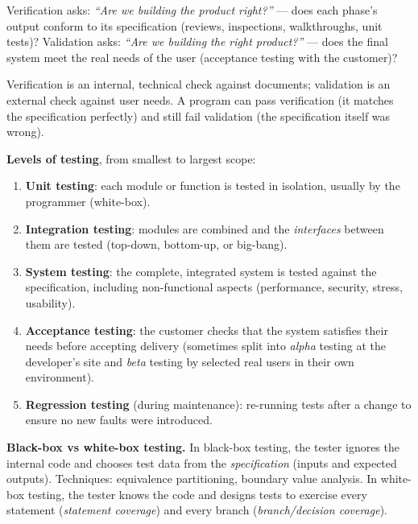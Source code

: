\documentclass[11pt]{article}
\newcommand{\cle}[1]{{\popxbold\color{popdark}#1}}
\begin{document}
\begin{definition}
\cle{Verification} asks: \emph{``Are we building the product right?''} — does each phase's output conform to its specification (reviews, inspections, walkthroughs, unit tests)? \cle{Validation} asks: \emph{``Are we building the right product?''} — does the final system meet the real needs of the user (acceptance testing with the customer)?
\end{definition}

\begin{attention}
Verification is an internal, technical check against documents; validation is an external check against user needs. A program can pass verification (it matches the specification perfectly) and still fail validation (the specification itself was wrong).
\end{attention}

\textbf{Levels of testing}, from smallest to largest scope:

\begin{enumerate}
\item \textbf{Unit testing}: each module or function is tested in isolation, usually by the programmer (white-box).
\item \textbf{Integration testing}: modules are combined and the \emph{interfaces} between them are tested (top-down, bottom-up, or big-bang).
\item \textbf{System testing}: the complete, integrated system is tested against the specification, including non-functional aspects (performance, security, stress, usability).
\item \textbf{Acceptance testing}: the customer checks that the system satisfies their needs before accepting delivery (sometimes split into \emph{alpha} testing at the developer's site and \emph{beta} testing by selected real users in their own environment).
\item \textbf{Regression testing} (during maintenance): re-running tests after a change to ensure no new faults were introduced.
\end{enumerate}

\textbf{Black-box vs white-box testing.} In \cle{black-box} testing, the tester ignores the internal code and chooses test data from the \emph{specification} (inputs and expected outputs). Techniques: equivalence partitioning, boundary value analysis. In \cle{white-box} testing, the tester knows the code and designs tests to exercise every statement (\emph{statement coverage}) and every branch (\emph{branch/decision coverage}).
\end{document}
